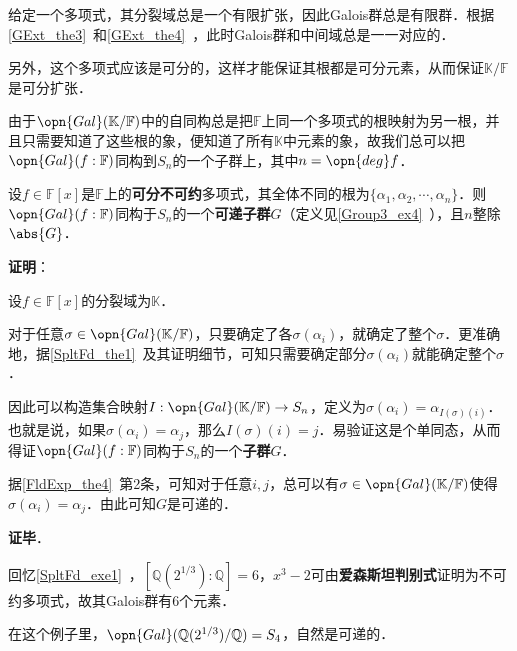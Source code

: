 给定一个多项式，其分裂域总是一个有限扩张，因此Galois群总是有限群．根据\autoref{GExt_the3}~和\autoref{GExt_the4}~，此时Galois群和中间域总是一一对应的．

另外，这个多项式应该是可分的，这样才能保证其根都是可分元素，从而保证$\mathbb{K}/\mathbb{F}$是可分扩张．

由于$\opn{Gal}(\mathbb{K}/\mathbb{F})$中的自同构总是把$\mathbb{F}$上同一个多项式的根映射为另一根，并且只需要知道了这些根的象，便知道了所有$\mathbb{K}$中元素的象，故我们总可以把$\opn{Gal}(f:\mathbb{F})$同构到$S_n$的一个子群上，其中$n=\opn{deg}f$．

\begin{theorem}{}
设$f\in\mathbb{F}[x]$是$\mathbb{F}$上的\textbf{可分不可约}多项式，其全体不同的根为$\{\alpha_1, \alpha_2, \cdots, \alpha_n\}$．则$\opn{Gal}(f:\mathbb{F})$同构于$S_n$的一个\textbf{可递子群}$G$（定义见\autoref{Group3_ex4}~），且$n$整除$\abs{G}$．
\end{theorem}

\textbf{证明}：

设$f\in\mathbb{F}[x]$的分裂域为$\mathbb{K}$．

对于任意$\sigma\in\opn{Gal}(\mathbb{K}/\mathbb{F})$，只要确定了各$\sigma(\alpha_i)$，就确定了整个$\sigma$．更准确地，据\autoref{SpltFd_the1}~及其证明细节，可知只需要确定部分$\sigma(\alpha_i)$就能确定整个$\sigma$．

因此可以构造集合映射$I:\opn{Gal}(\mathbb{K}/\mathbb{F})\to S_n$，定义为$\sigma(\alpha_i)=\alpha_{I(\sigma)(i)}$．也就是说，如果$\sigma(\alpha_i)=\alpha_j$，那么$I(\sigma)(i)=j$．易验证这是个单同态，从而得证$\opn{Gal}(f:\mathbb{F})$同构于$S_n$的一个\textbf{子群}$G$．

据\autoref{FldExp_the4}~第2条，可知对于任意$i, j$，总可以有$\sigma\in\opn{Gal}(\mathbb{K}/\mathbb{F})$使得$\sigma(\alpha_i)=\alpha_j$．由此可知$G$是可递的．

\textbf{证毕}．


\begin{example}{}
回忆\autoref{SpltFd_exe1}~，$[\mathbb{Q}(2^{1/3}):\mathbb{Q}]=6$，$x^3-2$可由\textbf{爱森斯坦判别式}证明为不可约多项式，故其Galois群有6个元素．

在这个例子里，$\opn{Gal}(\mathbb{Q}(2^{1/3})/\mathbb{Q})=S_4$，自然是可递的．
\end{example}


